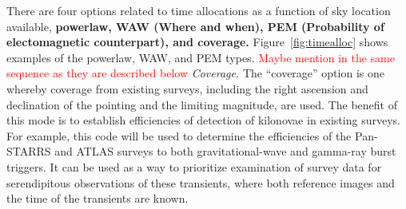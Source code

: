 \documentclass[twocolumn]{aastex62}
\begin{document}
There are four options related to time allocations as a function of sky location available, \textbf{powerlaw, WAW (Where and when), PEM (Probability of electomagnetic counterpart), and coverage.} Figure~\ref{fig:timealloc} shows examples of the powerlaw, WAW, and PEM types.
\textcolor{red}{Maybe mention in the same sequence as they are described below}
\emph{Coverage.} The ``coverage'' option is one whereby coverage from existing surveys, including the right ascension and declination of the pointing and the limiting magnitude, are used. The benefit of this mode is to establish efficiencies of detection of kilonovae in existing surveys. For example, this code will be used to determine the efficiencies of the Pan-STARRS and ATLAS surveys to both gravitational-wave and gamma-ray burst triggers. It can be used as a way to prioritize examination of survey data for serendipitous observations of these transients, where both reference images and the time of the transients are known.
\end{document}
